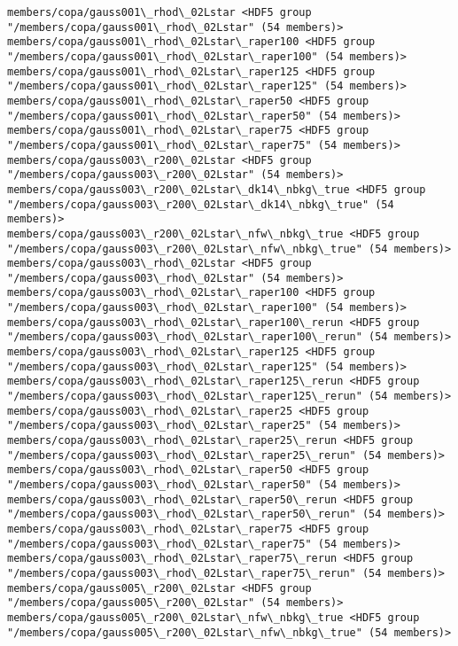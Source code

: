 \documentclass[11pt]{article}
\begin{document}
\begin{Verbatim}[commandchars=\\\{\}]
members/copa/gauss001\_rhod\_02Lstar <HDF5 group "/members/copa/gauss001\_rhod\_02Lstar" (54 members)>
members/copa/gauss001\_rhod\_02Lstar\_raper100 <HDF5 group "/members/copa/gauss001\_rhod\_02Lstar\_raper100" (54 members)>
members/copa/gauss001\_rhod\_02Lstar\_raper125 <HDF5 group "/members/copa/gauss001\_rhod\_02Lstar\_raper125" (54 members)>
members/copa/gauss001\_rhod\_02Lstar\_raper50 <HDF5 group "/members/copa/gauss001\_rhod\_02Lstar\_raper50" (54 members)>
members/copa/gauss001\_rhod\_02Lstar\_raper75 <HDF5 group "/members/copa/gauss001\_rhod\_02Lstar\_raper75" (54 members)>
members/copa/gauss003\_r200\_02Lstar <HDF5 group "/members/copa/gauss003\_r200\_02Lstar" (54 members)>
members/copa/gauss003\_r200\_02Lstar\_dk14\_nbkg\_true <HDF5 group "/members/copa/gauss003\_r200\_02Lstar\_dk14\_nbkg\_true" (54 members)>
members/copa/gauss003\_r200\_02Lstar\_nfw\_nbkg\_true <HDF5 group "/members/copa/gauss003\_r200\_02Lstar\_nfw\_nbkg\_true" (54 members)>
members/copa/gauss003\_rhod\_02Lstar <HDF5 group "/members/copa/gauss003\_rhod\_02Lstar" (54 members)>
members/copa/gauss003\_rhod\_02Lstar\_raper100 <HDF5 group "/members/copa/gauss003\_rhod\_02Lstar\_raper100" (54 members)>
members/copa/gauss003\_rhod\_02Lstar\_raper100\_rerun <HDF5 group "/members/copa/gauss003\_rhod\_02Lstar\_raper100\_rerun" (54 members)>
members/copa/gauss003\_rhod\_02Lstar\_raper125 <HDF5 group "/members/copa/gauss003\_rhod\_02Lstar\_raper125" (54 members)>
members/copa/gauss003\_rhod\_02Lstar\_raper125\_rerun <HDF5 group "/members/copa/gauss003\_rhod\_02Lstar\_raper125\_rerun" (54 members)>
members/copa/gauss003\_rhod\_02Lstar\_raper25 <HDF5 group "/members/copa/gauss003\_rhod\_02Lstar\_raper25" (54 members)>
members/copa/gauss003\_rhod\_02Lstar\_raper25\_rerun <HDF5 group "/members/copa/gauss003\_rhod\_02Lstar\_raper25\_rerun" (54 members)>
members/copa/gauss003\_rhod\_02Lstar\_raper50 <HDF5 group "/members/copa/gauss003\_rhod\_02Lstar\_raper50" (54 members)>
members/copa/gauss003\_rhod\_02Lstar\_raper50\_rerun <HDF5 group "/members/copa/gauss003\_rhod\_02Lstar\_raper50\_rerun" (54 members)>
members/copa/gauss003\_rhod\_02Lstar\_raper75 <HDF5 group "/members/copa/gauss003\_rhod\_02Lstar\_raper75" (54 members)>
members/copa/gauss003\_rhod\_02Lstar\_raper75\_rerun <HDF5 group "/members/copa/gauss003\_rhod\_02Lstar\_raper75\_rerun" (54 members)>
members/copa/gauss005\_r200\_02Lstar <HDF5 group "/members/copa/gauss005\_r200\_02Lstar" (54 members)>
members/copa/gauss005\_r200\_02Lstar\_nfw\_nbkg\_true <HDF5 group "/members/copa/gauss005\_r200\_02Lstar\_nfw\_nbkg\_true" (54 members)>

\end{Verbatim}
\end{document}
